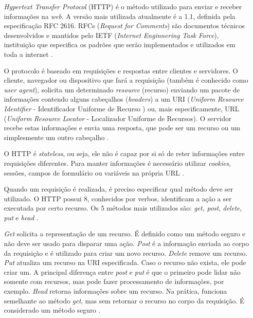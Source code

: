 \textit{Hypertext Transfer Protocol} (HTTP)  é o método utilizado para enviar e receber informações na \textit{web}.  A versão mais utilizada atualmente é a 1.1, definida pela especificação RFC 2616. RFCs (\textit{Request for Comments}) são documentos técnicos desenvolvidos e mantidos pelo IETF (\textit{Internet Enginnering Task Force}), instituição que especifica os padrões que serão implementados e utilizados em toda a internet \cite{vieira2007}.

 O protocolo é baseado em requisições e respostas entre clientes e servidores. O cliente, navegador ou dispositivo que fará a requisição (também é conhecido como \textit{user agent}), solicita um determinado  \textit{resource} (recurso) enviando um pacote de informações contendo alguns cabeçalhos (\textit{headers}) a um URI (\textit{Uniform Resource Identifier} - Identificador Uniforme de Recurso ) ou, mais especificamente, URL (\textit{Uniform Resource Locator} - Localizador Uniforme de Recursos). O servidor recebe estas informações e envia uma resposta, que pode ser um recurso ou um simplesmente um outro cabeçalho \cite{vieira2007}.
 
 O HTTP é\textit{ stateless}, ou seja, ele não é capaz por si só de reter informações entre requisições diferentes. Para manter informações é necessário utilizar \textit{cookies}, sessões, campos de formulário ou variáveis na própria URL \cite{vieira2007}.
 
Quando um requisição é realizada, é preciso especificar qual método deve ser utilizado. O HTTP possui 8,  conhecidos por verbos, 
identificam a ação a ser executada por certo recurso.  Os 5 métodos mais utilizados são: \textit{get, post}, \textit{delete}, \textit{put} e \textit{head} \cite{vieira2007}\cite{szigalski2018}. 

\textit{Get} solicita a representação  de um recurso. É definido como um método seguro e não deve ser usado para disparar uma ação.  \textit{Post} é a informação enviada ao corpo da requisição e é utilizado para criar um novo recurso. \textit{Delete} remove um recurso. \textit{Put} atualiza um recurso na URI especificada. Caso o recurso não exista, ele pode criar um. A principal diferença entre \textit{post} e \textit{put} é que o primeiro pode lidar não somente com recursos, mas pode fazer processamento de informações, por exemplo. \textit{Head} retorna informações sobre um recurso. Na prática, funciona semelhante ao método \textit{get}, mas sem retornar o recurso no corpo da requisição. É considerado um método seguro \cite{vieira2007}.

